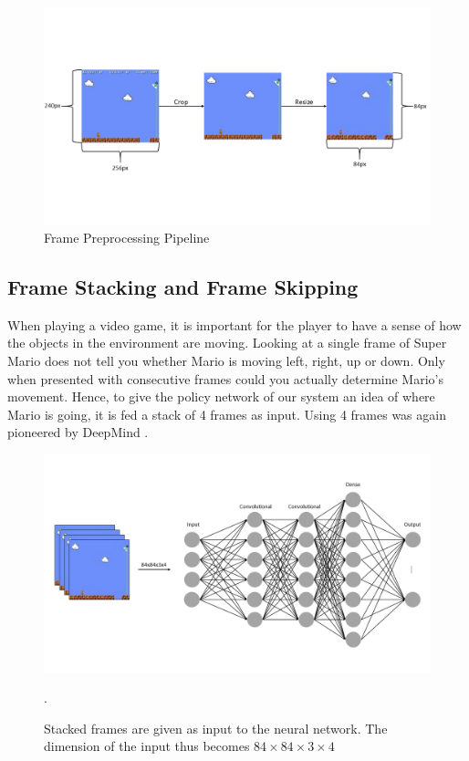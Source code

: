 \documentclass[notitlepage,a4paper,11pt]{article}
\begin{document}
\begin{figure}[!htb]
\centering
\includegraphics[trim={0 4.5cm 0 5cm},clip,width=1\linewidth]{figs/frame_preprocessing.png}
\caption{Frame Preprocessing Pipeline}
\end{figure}



\subsection{Frame Stacking and Frame Skipping} \label{frame_stacking_skipping}
When playing a video game, it is important for the player to have a sense of how the objects in the environment are moving. Looking at a single frame of Super Mario does not tell you whether Mario is moving left, right, up or down. Only when presented with consecutive frames could you actually determine Mario's movement. Hence, to give the policy network of our system an idea of where Mario is going, it is fed a stack of 4 frames as input. Using 4 frames was again pioneered by DeepMind \cite{DBLP:journals/corr/MnihKSGAWR13}.

\begin{figure}[!htb]
\centering
\includegraphics[trim={0 2cm 0 2cm}, clip, width=.75\linewidth]{figs/frame_stacking_nn.png}
\caption{Stacked frames are given as input to the neural network. The dimension of the input thus becomes $84 \times 84 \times 3 \times 4$}.
\end{figure}
\end{document}
